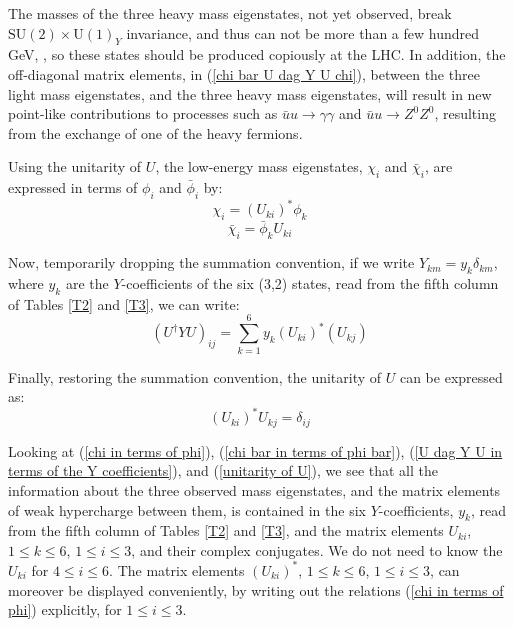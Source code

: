 \documentclass[a4paper,12pt,oneside]{article}
\begin{document}
The masses of the three heavy mass eigenstates, not yet observed, 
break $\mathrm{SU}(2)\times\mathrm{U}(1)_Y$ invariance, and thus 
can not be more than a few hundred GeV, \cite{Adler}, so these 
states should be produced copiously at the LHC.  In addition, the
off-diagonal matrix elements, in (\ref{chi bar U dag Y U chi}), 
between the three light mass eigenstates, and the three heavy mass
eigenstates, will result in new point-like contributions to 
processes such as $\bar{u}u\to\gamma\gamma$ and $\bar{u}u\to 
Z^0Z^0$, resulting from the exchange of one of the heavy fermions.

Using the unitarity of $U$, the low-energy mass eigenstates, 
$\chi_i$ and $\bar{\chi}_i$, are expressed in terms of $\phi_i$ and
$\bar{\phi}_i$ by:
\begin{equation}\label{chi in terms of phi}
\chi_i=\left(U_{ki}\right)^*\phi_k
\end{equation}
\begin{equation}\label{chi bar in terms of phi bar}
\bar{\chi}_i=\bar{\phi}_kU_{ki}
\end{equation}

Now, temporarily dropping the summation convention, if we write
$Y_{km}=y_k\delta_{km}$, where $y_k$ are the $Y$-coefficients of the
six (3,2) states, read from the fifth column of Tables \ref{T2} and
\ref{T3}, we can write:
\begin{equation}\label{U dag Y U in terms of the Y coefficients}
\left(U^\dag YU\right)_{ij}=\sum_{k=1}^6y_k\left(U_{ki}\right)^*
\left(U_{kj}\right)
\end{equation}

Finally, restoring the summation convention, the unitarity of $U$
can be expressed as:
\begin{equation}\label{unitarity of U}
\left(U_{ki}\right)^*U_{kj}=\delta_{ij}
\end{equation}

Looking at (\ref{chi in terms of phi}),
(\ref{chi bar in terms of phi bar}),
(\ref{U dag Y U in terms of the Y coefficients}), and
(\ref{unitarity of U}), we see that all the information about the
three observed mass eigenstates, and the matrix elements of weak
hypercharge between them, is contained in the six $Y$-coefficients,
$y_k$, read from the fifth column of Tables \ref{T2} and \ref{T3},
and the matrix elements $U_{ki}$, $1\leq k\leq 6$, $1\leq i\leq 3$,
and their complex conjugates.  We do not need to know the $U_{ki}$
for $4\leq i\leq 6$.  The matrix elements $\left(U_{ki}\right)^*$, 
$1\leq k\leq 6$, $1\leq i\leq 3$, can moreover be displayed 
conveniently, by writing out the relations 
(\ref{chi in terms of phi}) explicitly, for $1\leq i\leq 3$.
\end{document}
